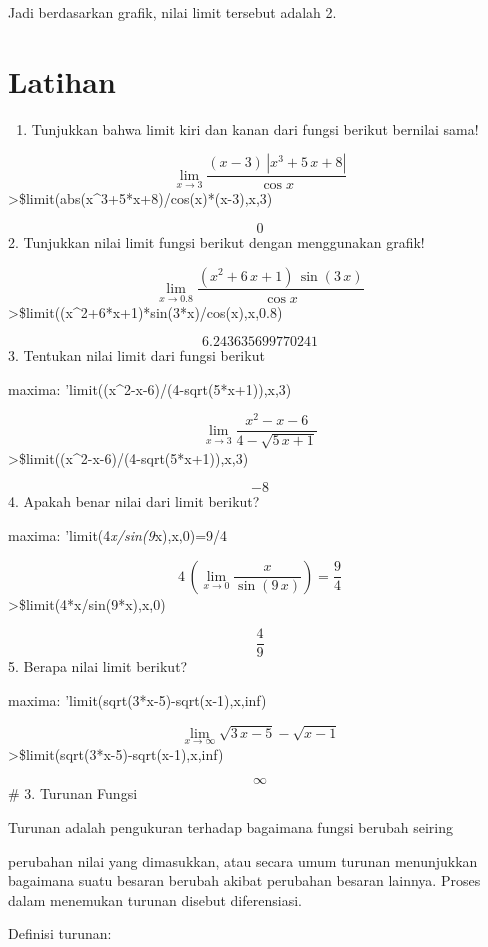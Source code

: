 \documentclass[
]{book}
\providecommand{\tightlist}{%
  \setlength{\itemsep}{0pt}\setlength{\parskip}{0pt}}
\begin{document}
Jadi berdasarkan grafik, nilai limit tersebut adalah 2.

\section{Latihan}\label{latihan-1}

\begin{enumerate}
\def\labelenumi{\arabic{enumi}.}
\tightlist
\item
  Tunjukkan bahwa limit kiri dan kanan dari fungsi berikut bernilai sama!
\end{enumerate}

\[\lim_{x\rightarrow 3}{\frac{\left(x-3\right)\,\left| x^3+5\,x+8  \right| }{\cos x}}\]\textgreater\$limit(abs(x\^{}3+5*x+8)/cos(x)*(x-3),x,3)

\[0\]2. Tunjukkan nilai limit fungsi berikut dengan menggunakan grafik!

\[\lim_{x\rightarrow 0.8}{\frac{\left(x^2+6\,x+1\right)\,\sin \left(3  \,x\right)}{\cos x}}\]\textgreater\$limit((x\^{}2+6*x+1)*sin(3*x)/cos(x),x,0.8)

\[6.243635699770241\]3. Tentukan nilai limit dari fungsi berikut

maxima: 'limit((x\^{}2-x-6)/(4-sqrt(5*x+1)),x,3)

\[\lim_{x\rightarrow 3}{\frac{x^2-x-6}{4-\sqrt{5\,x+1}}}\]\textgreater\$limit((x\^{}2-x-6)/(4-sqrt(5*x+1)),x,3)

\[-8\]4. Apakah benar nilai dari limit berikut?

maxima: 'limit(4\emph{x/sin(9}x),x,0)=9/4

\[4\,\left(\lim_{x\rightarrow 0}{\frac{x}{\sin \left(9\,x\right)}}  \right)=\frac{9}{4}\]\textgreater\$limit(4*x/sin(9*x),x,0)

\[\frac{4}{9}\]5. Berapa nilai limit berikut?

maxima: 'limit(sqrt(3*x-5)-sqrt(x-1),x,inf)

\[\lim_{x\rightarrow \infty }{\sqrt{3\,x-5}-\sqrt{x-1}}\]\textgreater\$limit(sqrt(3*x-5)-sqrt(x-1),x,inf)

\[\infty \]\# 3. Turunan Fungsi

Turunan adalah pengukuran terhadap bagaimana fungsi berubah seiring

perubahan nilai yang dimasukkan, atau secara umum turunan menunjukkan bagaimana suatu besaran berubah akibat perubahan besaran lainnya. Proses dalam menemukan turunan disebut diferensiasi.

Definisi turunan:
\end{document}
